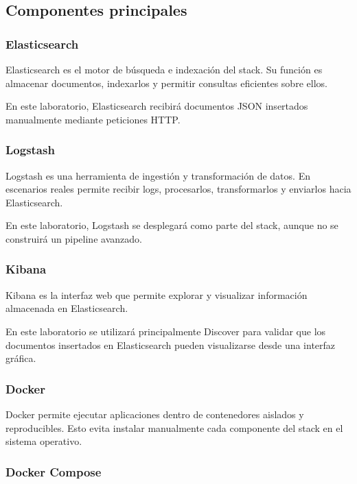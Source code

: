 \documentclass[
  coursetitle={Cómputo Nube y Tecnologías Emergentes},
  coursehours={96},
  coursedate={Verano 2026},
  doctype={Práctica},
  otherlangs={english,french},
  authorname={Lázaro},
  authorsurname={Bustio-Martínez},
  authortitle={PhD},
  role={Profesor Investigador},
  email={lbustio@inaoe.mx},
  phone={5559504000},
  ext={7459},
  institution={Instituto Nacional de Astrofísica, Óptica y Electrónica (INAOE)},
  department={Maestría en Ciencias en Tecnologías de Seguridad},
  address={Luis Enrique Erro 1, Sta. Ma. Tonantzintla, San Andrés Cholula, CP 72840, Puebla, México},
  margin={0.5in}
]{../../lbustio_lecture_notes}
\begin{document}
\subsection{Componentes principales}

\subsubsection{Elasticsearch}

Elasticsearch es el motor de búsqueda e indexación del stack. Su función es almacenar documentos, indexarlos y permitir consultas eficientes sobre ellos.

En este laboratorio, Elasticsearch recibirá documentos JSON insertados manualmente mediante peticiones HTTP.

\subsubsection{Logstash}

Logstash es una herramienta de ingestión y transformación de datos. En escenarios reales permite recibir logs, procesarlos, transformarlos y enviarlos hacia Elasticsearch.

En este laboratorio, Logstash se desplegará como parte del stack, aunque no se construirá un pipeline avanzado.

\subsubsection{Kibana}

Kibana es la interfaz web que permite explorar y visualizar información almacenada en Elasticsearch.

En este laboratorio se utilizará principalmente Discover para validar que los documentos insertados en Elasticsearch pueden visualizarse desde una interfaz gráfica.

\subsubsection{Docker}

Docker permite ejecutar aplicaciones dentro de contenedores aislados y reproducibles. Esto evita instalar manualmente cada componente del stack en el sistema operativo.

\subsubsection{Docker Compose}
\end{document}
